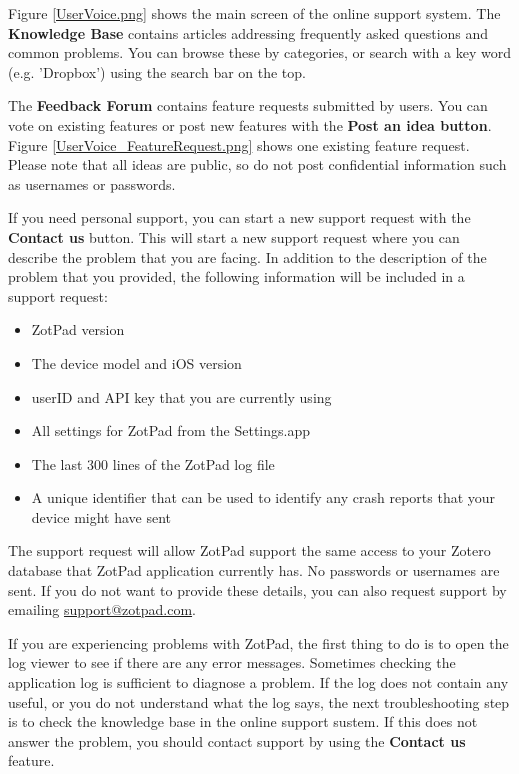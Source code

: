 \documentclass[oneside, openany, 12pt]{tufte-book}
\newcommand{\image}[2]{
	\center
	\fbox{\texttt{[image: images/iPhone/\{\#2]}}}

	\refstepcounter{figure}
	\smallskip\noindent\small Figure \thefigure: #1
	\label{#2}
	}
\newcommand{\image}[2]{
	\caption{#1}
	\label{#2}
	\fbox{\texttt{[image: images/iPad/\{\#2]}}}
	}
\begin{document}
Figure \ref{UserVoice.png} shows the main screen of the online support system. The \textbf{Knowledge Base} contains articles addressing frequently asked questions and common problems. You can browse these by categories, or search with a key word (e.g. 'Dropbox') using the search bar on the top. 

\begin{figure}
\image{Online support}{UserVoice.png}
\end{figure}

The \textbf{Feedback Forum} contains feature requests submitted by users. You can vote on existing features or post new features with the \textbf{Post an idea button}. Figure \ref{UserVoice_FeatureRequest.png} shows one existing feature request. Please note that all ideas are public, so do not post confidential information such as usernames or passwords.

\begin{figure}
\image{Feature requests}{UserVoice_FeatureRequest.png}
\end{figure}

If you need personal support, you can start a new support request with the \textbf{Contact us} button. This will start a new support request where you can describe the problem that you are facing. In addition to the description of the problem that you provided, the following information will be included in a support request:

\begin{itemize}
  \item ZotPad version
  \item The device model and iOS version
  \item userID and API key that you are currently using
  \item All settings for ZotPad from the Settings.app
  \item The last 300 lines of the ZotPad log file
  \item A unique identifier that can be used to identify any crash reports that your device might have sent
\end{itemize}

The support request will allow ZotPad support the same access to your Zotero database that ZotPad application currently has. No passwords or usernames are sent. If you do not want to provide these details, you can also request support by emailing \href{mailto:support@zotpad.com}{support@zotpad.com}.

If you are experiencing problems with ZotPad, the first thing to do is to open the log viewer to see if there are any error messages. Sometimes checking the application log is sufficient to diagnose a problem. If the log does not contain any useful, or you do not understand what the log says, the next troubleshooting step is to check the knowledge base in the online support sustem. If this does not answer the problem, you should contact support by using the \textbf{Contact us} feature.
\end{document}

